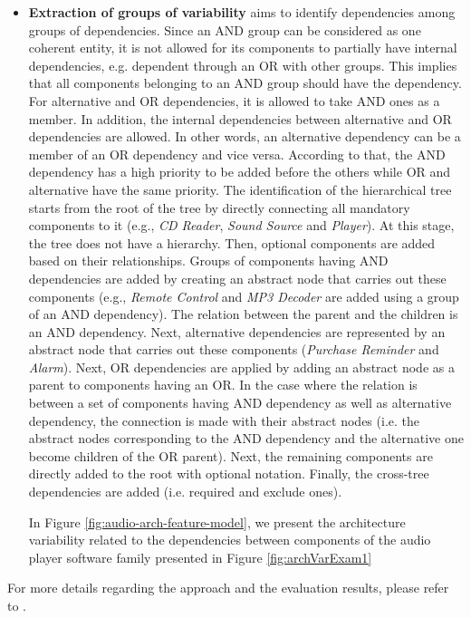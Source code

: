 \documentclass[graybox]{svmult}
\begin{document}
\begin{itemize}
\item \textbf{Extraction of groups of variability} aims to identify dependencies among groups of dependencies. Since an AND group can be considered as one coherent entity, it is not allowed for its components to partially have internal dependencies, e.g. dependent through an OR with other groups. This implies that all components belonging to an AND group should have the dependency.
For alternative and OR dependencies, it is allowed to take AND ones as a member. In addition, the internal dependencies between alternative and OR dependencies are allowed. In other words, an alternative dependency can be a member of an OR dependency and vice versa. 
According to that, the AND dependency has a high priority to be added before the others while OR and alternative have the same priority.
The identification of the hierarchical tree starts from the root of the tree by directly connecting all mandatory components to it  {(e.g., \textit{CD Reader}, \textit{Sound Source} and \textit{Player})}. At this stage, the tree does not have a hierarchy. Then, optional components are added based on their relationships. Groups of components having AND dependencies are added by creating an abstract node that carries out these components  {(e.g., \textit{Remote Control} and \textit{MP3 Decoder} are added using a group of an AND dependency)}. The relation between the parent and the children is an AND dependency. Next, alternative dependencies are represented by an abstract node that carries out these components (\textit{Purchase Reminder} and \textit{Alarm}). Next, OR dependencies are applied by adding an abstract node as a parent to components having an OR. In the case where the relation is between a set of components having AND dependency as well as alternative dependency, the connection is made with their abstract nodes (i.e. the abstract nodes corresponding to the AND dependency and the alternative one become children of the OR parent). Next, the remaining components are directly added to the root with optional notation. Finally, the cross-tree dependencies are added (i.e. required and exclude ones). 

{In Figure \ref{fig:audio-arch-feature-model}, we present the architecture variability related to the dependencies between components of the audio player software family presented in Figure \ref{fig:archVarExam1}}
\end{itemize} 

{For more details regarding the approach and the evaluation results, please refer to \cite{shatnawi2017recovering}.}
\end{document}

